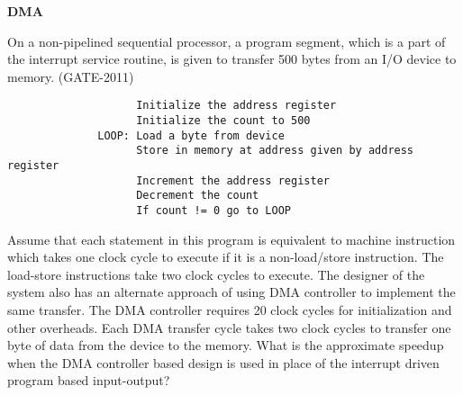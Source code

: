 
\centerline{\textbf{ \LARGE DMA }}

\begin{questyle}
  \question  On a non-pipelined sequential processor, a program segment, which is a part of the
             interrupt service routine, is given to transfer 500 bytes from an I/O device to memory.  (GATE-2011)
              \begin{lstlisting}
                    Initialize the address register
                    Initialize the count to 500
              LOOP: Load a byte from device
                    Store in memory at address given by address register
                    Increment the address register
                    Decrement the count
                    If count != 0 go to LOOP
              \end{lstlisting}
              Assume that each statement in this program is equivalent to machine instruction which
              takes one clock cycle to execute if it is a non-load/store instruction. The load-store
              instructions take two clock cycles to execute. The designer of the system also has an
              alternate approach of using DMA controller to implement the same transfer. The DMA
              controller requires 20 clock cycles for initialization and other overheads. Each DMA
              transfer cycle takes two clock cycles to transfer one byte of data from the device to
              the memory. What is the approximate speedup when the DMA controller based design is
              used in place of the interrupt driven program based input-output?
  \begin{choices}
  \end{choices}
\end{questyle}
